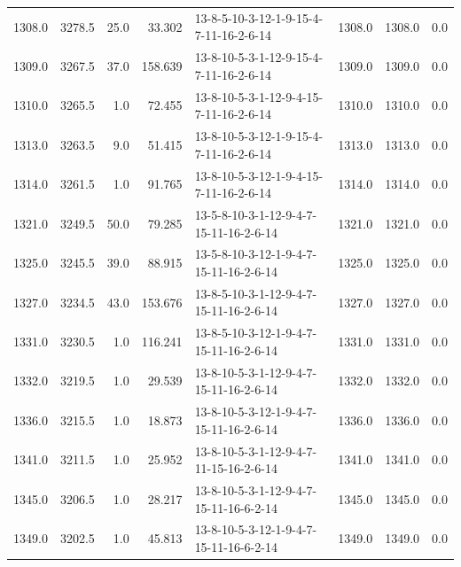 \begin{tabular}{rrrrlrrr}
 1308.0 &  3278.5 &           25.0 &             33.302 &  13-8-5-10-3-12-1-9-15-4-7-11-16-2-6-14 &        1308.0 &          1308.0 &       0.0 \\
 1309.0 &  3267.5 &           37.0 &            158.639 &  13-8-10-5-3-1-12-9-15-4-7-11-16-2-6-14 &        1309.0 &          1309.0 &       0.0 \\
 1310.0 &  3265.5 &            1.0 &             72.455 &  13-8-10-5-3-1-12-9-4-15-7-11-16-2-6-14 &        1310.0 &          1310.0 &       0.0 \\
 1313.0 &  3263.5 &            9.0 &             51.415 &  13-8-10-5-3-12-1-9-15-4-7-11-16-2-6-14 &        1313.0 &          1313.0 &       0.0 \\
 1314.0 &  3261.5 &            1.0 &             91.765 &  13-8-10-5-3-12-1-9-4-15-7-11-16-2-6-14 &        1314.0 &          1314.0 &       0.0 \\
 1321.0 &  3249.5 &           50.0 &             79.285 &  13-5-8-10-3-1-12-9-4-7-15-11-16-2-6-14 &        1321.0 &          1321.0 &       0.0 \\
 1325.0 &  3245.5 &           39.0 &             88.915 &  13-5-8-10-3-12-1-9-4-7-15-11-16-2-6-14 &        1325.0 &          1325.0 &       0.0 \\
 1327.0 &  3234.5 &           43.0 &            153.676 &  13-8-5-10-3-1-12-9-4-7-15-11-16-2-6-14 &        1327.0 &          1327.0 &       0.0 \\
 1331.0 &  3230.5 &            1.0 &            116.241 &  13-8-5-10-3-12-1-9-4-7-15-11-16-2-6-14 &        1331.0 &          1331.0 &       0.0 \\
 1332.0 &  3219.5 &            1.0 &             29.539 &  13-8-10-5-3-1-12-9-4-7-15-11-16-2-6-14 &        1332.0 &          1332.0 &       0.0 \\
 1336.0 &  3215.5 &            1.0 &             18.873 &  13-8-10-5-3-12-1-9-4-7-15-11-16-2-6-14 &        1336.0 &          1336.0 &       0.0 \\
 1341.0 &  3211.5 &            1.0 &             25.952 &  13-8-10-5-3-1-12-9-4-7-11-15-16-2-6-14 &        1341.0 &          1341.0 &       0.0 \\
 1345.0 &  3206.5 &            1.0 &             28.217 &  13-8-10-5-3-1-12-9-4-7-15-11-16-6-2-14 &        1345.0 &          1345.0 &       0.0 \\
 1349.0 &  3202.5 &            1.0 &             45.813 &  13-8-10-5-3-12-1-9-4-7-15-11-16-6-2-14 &        1349.0 &          1349.0 &       0.0 \\

\end{tabular}
